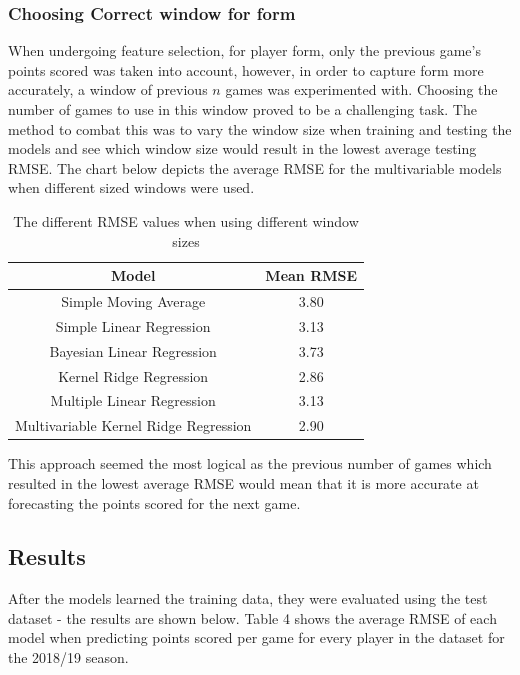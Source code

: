 \documentclass[a4paper,11pt,twoside]{article}
\begin{document}
\subsubsection{Choosing Correct window for form}
When undergoing feature selection, for player form, only the previous game's points scored was taken into account, however, in order to capture form more accurately, a window of previous $n$ games was experimented with. Choosing the number of games to use in this window proved to be a challenging task. The method to combat this was to vary the window size when training and testing the models and see which window size would result in the lowest average testing RMSE. The chart below depicts the average RMSE for the multivariable models when different sized windows were used. 
\vspace{5mm}
\begin{table}[h!]
\captionsetup{justification=centering}
\begin{center}
\begin{tabular}{ |c|c|} 
 \hline
     \textbf{Model} & \textbf{Mean RMSE}\\ 
 \hline
 Simple Moving Average  & 3.80\\ 
 \hline
 Simple Linear Regression & 3.13\\ 
 \hline
 Bayesian Linear Regression  & 3.73 \\
 \hline
 Kernel Ridge Regression  & 2.86\\
 \hline
 Multiple Linear Regression& 3.13\\
 \hline
 Multivariable Kernel Ridge Regression  & 2.90\\
 \hline
\end{tabular}
\end{center}
\caption{The different RMSE values when using different window sizes}
\end{table}
\vspace{5mm}

This approach seemed the most logical as the previous number of games which resulted in the lowest average RMSE would mean that it is more accurate at forecasting the points scored for the next game.

\subsection{Results}

After the models learned the training data, they were evaluated using the test dataset - the results are shown below. Table 4 shows the average RMSE of each model when predicting points scored per game for every player in the dataset for the 2018/19 season.
\end{document}
